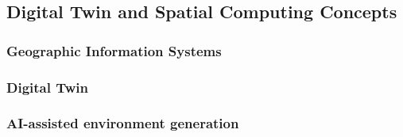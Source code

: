\subsection{Digital Twin and Spatial Computing Concepts}

\subsubsection{Geographic Information Systems}

\subsubsection{Digital Twin}

\subsubsection{AI-assisted environment generation}